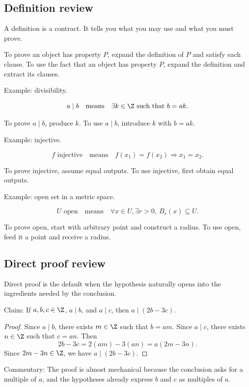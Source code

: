 \subsection{Definition review}

A definition is a contract. It tells you what you may use and what you must prove.

\begin{formalbox}
To prove an object has property $P$, expand the definition of $P$ and satisfy each clause. To use the fact that an object has property $P$, expand the definition and extract its clauses.
\end{formalbox}

Example: divisibility.

\[
a\mid b\quad\text{means}\quad \exists k\in\Z\text{ such that }b=ak.
\]

To prove $a\mid b$, produce $k$. To use $a\mid b$, introduce $k$ with $b=ak$.

Example: injective.

\[
f\text{ injective}\quad\text{means}\quad f(x_1)=f(x_2)\Rightarrow x_1=x_2.
\]

To prove injective, assume equal outputs. To use injective, first obtain equal outputs.

Example: open set in a metric space.

\[
U\text{ open}\quad\text{means}\quad \forall x\in U,\exists r>0,\ B_r(x)\subseteq U.
\]

To prove open, start with arbitrary point and construct a radius. To use open, feed it a point and receive a radius.

\subsection{Direct proof review}

Direct proof is the default when the hypothesis naturally opens into the ingredients needed by the conclusion.

Claim: If $a,b,c\in\Z$, $a\mid b$, and $a\mid c$, then $a\mid(2b-3c)$.

\begin{proof}
Since $a\mid b$, there exists $m\in\Z$ such that $b=am$. Since $a\mid c$, there exists $n\in\Z$ such that $c=an$. Then
\[
2b-3c=2(am)-3(an)=a(2m-3n).
\]
Since $2m-3n\in\Z$, we have $a\mid(2b-3c)$.
\end{proof}

Commentary: The proof is almost mechanical because the conclusion asks for a multiple of $a$, and the hypotheses already express $b$ and $c$ as multiples of $a$.

